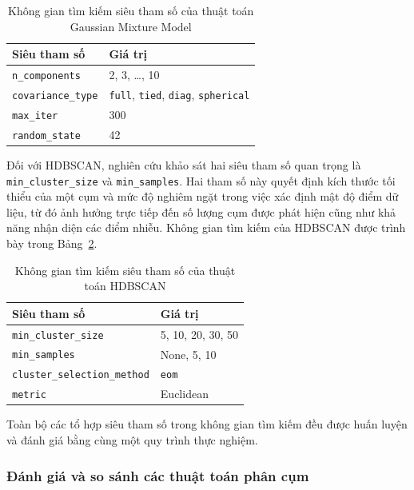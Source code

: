 \documentclass[12pt]{ai_conquer2026}
\begin{document}
\begin{table}[H]
\centering
\caption{Không gian tìm kiếm siêu tham số của thuật toán Gaussian Mixture Model}
\label{tab:gmm_hyperparameter}
\renewcommand{\arraystretch}{1.3}
\begin{tabular}{ll}
\toprule
\textbf{Siêu tham số} & \textbf{Giá trị} \\
\midrule
\texttt{n\_components} & 2, 3, \ldots, 10 \\
\texttt{covariance\_type} &
\texttt{full}, \texttt{tied}, \texttt{diag}, \texttt{spherical} \\
\texttt{max\_iter} & 300 \\
\texttt{random\_state} & 42 \\
\bottomrule
\end{tabular}
\end{table}


Đối với HDBSCAN, nghiên cứu khảo sát hai siêu tham số quan trọng là \texttt{min\_cluster\_size} và \texttt{min\_samples}. Hai tham số này quyết định kích thước tối thiểu của một cụm và mức độ nghiêm ngặt trong việc xác định mật độ điểm dữ liệu, từ đó ảnh hưởng trực tiếp đến số lượng cụm được phát hiện cũng như khả năng nhận diện các điểm nhiễu. Không gian tìm kiếm của HDBSCAN được trình bày trong Bảng~\ref{tab:hdbscan_hyperparameter}.

\begin{table}[H]
\centering
\caption{Không gian tìm kiếm siêu tham số của thuật toán HDBSCAN}
\label{tab:hdbscan_hyperparameter}
\renewcommand{\arraystretch}{1.3}
\begin{tabular}{ll}
\toprule
\textbf{Siêu tham số} & \textbf{Giá trị} \\
\midrule
\texttt{min\_cluster\_size} & 5, 10, 20, 30, 50 \\
\texttt{min\_samples} & None, 5, 10 \\
\texttt{cluster\_selection\_method} & \texttt{eom} \\
\texttt{metric} & Euclidean \\
\bottomrule
\end{tabular}
\end{table}

Toàn bộ các tổ hợp siêu tham số trong không gian tìm kiếm đều được huấn luyện và đánh giá bằng cùng một quy trình thực nghiệm.

\subsubsection{Đánh giá và so sánh các thuật toán phân cụm}
\end{document}
